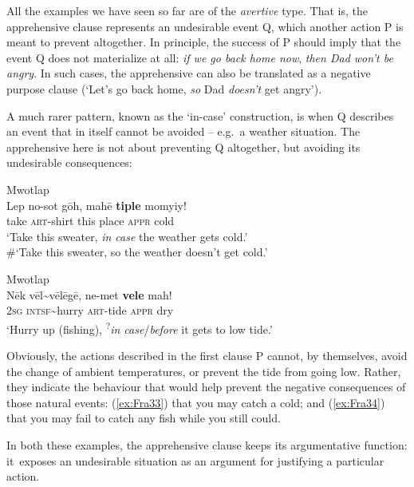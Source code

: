 \documentclass[output=paper,colorlinks,citecolor=brown]{langscibook}
\begin{document}
All the examples we have seen so far are of the \textit{avertive} type. That is, the apprehensive clause represents an undesirable event Q, which another action P is meant to prevent altogether. In principle, the success of P should imply that the event Q does not materialize at all: \textit{if we go back home now}, \textit{then Dad won't be angry}. In such cases, the apprehensive can also be translated as a negative purpose clause (`Let's go back home, \textit{so} Dad \textit{doesn't} get angry').

A much rarer pattern, known as the `in-case' construction, is when Q describes an event that in itself cannot be avoided -- e.g.\ a weather situation. The apprehensive here is not about preventing Q altogether, but avoiding its undesirable consequences:

\ea \label{ex:Fra33} \textnormal{Mwotlap}  \\
\gll Lep no-sot gōh, mahē \textbf{tiple} momyiy! \\
take \textsc{art}-shirt this place \textsc{appr} cold \\
\glt `Take this sweater, \textit{in case} the weather gets cold.' \\
\#`Take this sweater, so the weather doesn't get cold.' 
\z


\ea \label{ex:Fra34} \textnormal{Mwotlap}  \\
\gll Nēk vēl\textasciitilde vēlēgē, ne-met \textbf{vele} mah! \\
\textsc{2sg} \textsc{intsf}\textasciitilde hurry \textsc{art}-tide \textsc{appr} dry \\
\glt `Hurry up (fishing), \textsuperscript{?}\textit{in case}/\textit{before} it gets to low tide.' 
\z


 Obviously, the actions described in the first clause P cannot, by themselves, avoid the change of ambient temperatures, or prevent the tide from going low. Rather, they indicate the behaviour that would help prevent the negative consequences of those natural events: (\ref{ex:Fra33}) that you may catch a cold; and (\ref{ex:Fra34}) that you may fail to catch any fish while you still could.

In both these examples, the apprehensive clause keeps its argumenta\-tive function: it~exposes an undesirable situation as an argument for justifying a particular action.
\end{document}
